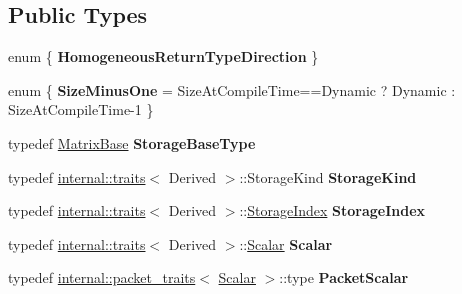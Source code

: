 \subsection*{Public Types}
\begin{DoxyCompactItemize}
\item 
\mbox{\label{class_eigen_1_1_matrix_base_a25c4a792f330f55098eeeb238334d262}} 
enum \{ {\bfseries Homogeneous\+Return\+Type\+Direction}
 \}
\item 
\mbox{\label{class_eigen_1_1_matrix_base_ac56f4be07f79d82ff8a6c1e55e217dfe}} 
enum \{ {\bfseries Size\+Minus\+One} = Size\+At\+Compile\+Time==Dynamic ? Dynamic \+: Size\+At\+Compile\+Time-\/1
 \}
\item 
\mbox{\label{class_eigen_1_1_matrix_base_ab63ffbeb0f4a86c3b48ecd408fc7d781}} 
typedef \mbox{\hyperlink{class_eigen_1_1_matrix_base}{Matrix\+Base}} {\bfseries Storage\+Base\+Type}
\item 
\mbox{\label{class_eigen_1_1_matrix_base_a55f0db3c246100e7ee833661638cf9ca}} 
typedef \mbox{\hyperlink{struct_eigen_1_1internal_1_1traits}{internal\+::traits}}$<$ Derived $>$\+::Storage\+Kind {\bfseries Storage\+Kind}
\item 
\mbox{\label{class_eigen_1_1_matrix_base_ac372dc481a1c43e82893c638717150d6}} 
typedef \mbox{\hyperlink{struct_eigen_1_1internal_1_1traits}{internal\+::traits}}$<$ Derived $>$\+::\mbox{\hyperlink{class_eigen_1_1_dense_base_a2d1aba3f6c414715d830f760913c7e00}{Storage\+Index}} {\bfseries Storage\+Index}
\item 
\mbox{\label{class_eigen_1_1_matrix_base_ac966a9548d81c18515e90b536d3b769e}} 
typedef \mbox{\hyperlink{struct_eigen_1_1internal_1_1traits}{internal\+::traits}}$<$ Derived $>$\+::\mbox{\hyperlink{class_eigen_1_1_dense_base_a5feed465b3a8e60c47e73ecce83e39a2}{Scalar}} {\bfseries Scalar}
\item 
\mbox{\label{class_eigen_1_1_matrix_base_abdb0e9a1b2110fd83afa525a7b9dd598}} 
typedef \mbox{\hyperlink{struct_eigen_1_1internal_1_1packet__traits}{internal\+::packet\+\_\+traits}}$<$ \mbox{\hyperlink{class_eigen_1_1_dense_base_a5feed465b3a8e60c47e73ecce83e39a2}{Scalar}} $>$\+::type {\bfseries Packet\+Scalar}

\end{DoxyCompactItemize}
